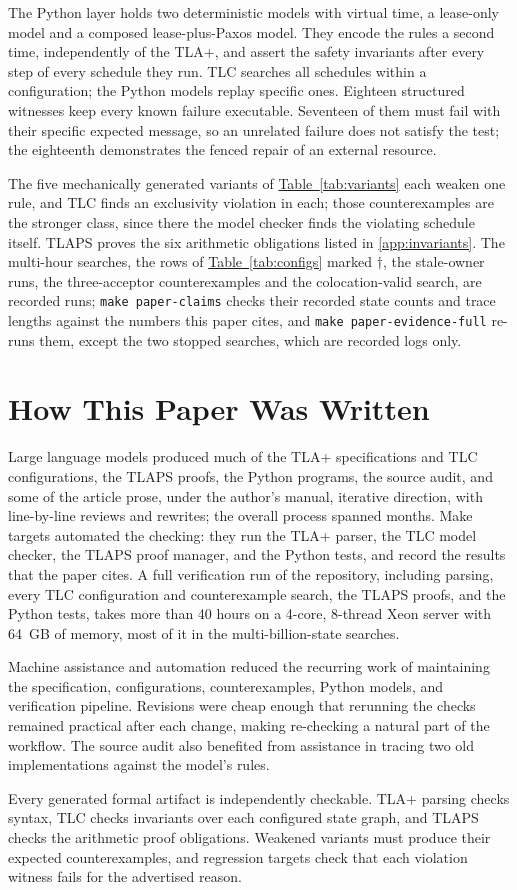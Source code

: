 \documentclass[final,5p,times,twocolumn,number]{elsarticle}
\newcommand{\code}[1]{\texttt{#1}}
\newcommand{\tabref}[1]{\hyperref[#1]{Table~\ref*{#1}}}
\begin{document}
The Python layer holds two deterministic models with virtual time, a lease-only model and a composed lease-plus-Paxos model.  They encode the rules a second time, independently of the TLA+, and assert the safety invariants after every step of every schedule they run.  TLC searches all schedules within a configuration; the Python models replay specific ones.  Eighteen structured witnesses keep every known failure executable.  Seventeen of them must fail with their specific expected message, so an unrelated failure does not satisfy the test; the eighteenth demonstrates the fenced repair of an external resource.

The five mechanically generated variants of \tabref{tab:variants} each weaken one rule, and TLC finds an exclusivity violation in each; those counterexamples are the stronger class, since there the model checker finds the violating schedule itself.  TLAPS proves the six arithmetic obligations listed in \ref{app:invariants}.  The multi-hour searches, the rows of \tabref{tab:configs} marked $\dagger$, the stale-owner runs, the three-acceptor counterexamples and the colocation-valid search, are recorded runs; \code{make paper-claims} checks their recorded state counts and trace lengths against the numbers this paper cites, and \code{make paper-evidence-full} re-runs them, except the two stopped searches, which are recorded logs only.

\section{How This Paper Was Written}\label{sec:llm}

Large language models produced much of the TLA+ specifications and TLC configurations, the TLAPS proofs, the Python programs, the source audit, and some of the article prose, under the author's manual, iterative direction, with line-by-line reviews and rewrites; the overall process spanned months.  Make targets automated the checking: they run the TLA+ parser, the TLC model checker, the TLAPS proof manager, and the Python tests, and record the results that the paper cites.  A full verification run of the repository, including parsing, every TLC configuration and counterexample search, the TLAPS proofs, and the Python tests, takes more than 40 hours on a 4-core, 8-thread Xeon server with 64~GB of memory, most of it in the multi-billion-state searches.

Machine assistance and automation reduced the recurring work of maintaining the specification, configurations, counterexamples, Python models, and verification pipeline.  Revisions were cheap enough that rerunning the checks remained practical after each change, making re-checking a natural part of the workflow.  The source audit also benefited from assistance in tracing two old implementations against the model's rules.

Every generated formal artifact is independently checkable.  TLA+ parsing checks syntax, TLC checks invariants over each configured state graph, and TLAPS checks the arithmetic proof obligations.  Weakened variants must produce their expected counterexamples, and regression targets check that each violation witness fails for the advertised reason.
\end{document}
